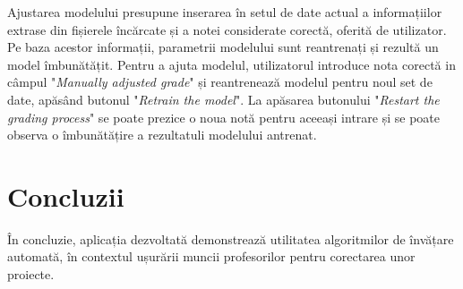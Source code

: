 \documentclass{article}
\begin{document}
Ajustarea modelului presupune inserarea în setul de date actual a informațiilor extrase  din fișierele încărcate și a notei considerate corectă, oferită de utilizator. Pe baza acestor informații, parametrii modelului sunt reantrenați și rezultă un model îmbunătățit. Pentru a ajuta modelul, utilizatorul introduce nota corectă in câmpul "\textit{Manually adjusted grade}" și reantrenează modelul pentru noul set de date, apăsând butonul "\textit{Retrain the model}". La apăsarea butonului "\textit{Restart the grading process}" se poate prezice o noua notă pentru aceeași intrare și se poate observa o îmbunătățire a rezultatuli modelului antrenat.

\section{Concluzii}

În concluzie, aplicația dezvoltată demonstrează utilitatea algoritmilor de învățare automată, în contextul ușurării muncii profesorilor pentru corectarea unor proiecte.
\end{document}
